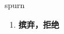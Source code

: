 
\begin{frame}
{\huge spurn}
\begin{center}
\begin{enumerate}\Large
  \item \textbf{摈弃，拒绝}
\end{enumerate}
\end{center}
\end{frame}
